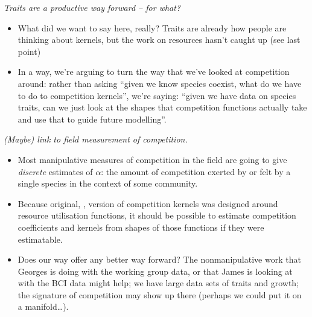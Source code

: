 \documentclass[a4paper,11pt]{article}
\begin{document}
\begin{itemize}
\textit{Traits are a productive way forward -- for what?}
\begin{itemize}
\item What did we want to say here, really?  Traits are already how
  people are thinking about kernels, but the work on resources hasn't
  caught up (see last point)
\item In a way, we're arguing to turn the way that we've looked at
  competition around: rather than asking ``given we know species
  coexist, what do we have to do to competition kernels'', we're
  saying: ``given we have data on species traits, can we just look at
  the shapes that competition functions actually take and use that to
  guide future modelling''.
\end{itemize}

\textit{(Maybe) link to field measurement of competition.}
\begin{itemize}
\item Most manipulative measures of competition in the field are going
  to give \emph{discrete} estimates of $\alpha$: the amount of
  competition exerted by or felt by a single species in the context of
  some community.
\item Because original, \citet{MacArthur-1967}, version of competition
  kernels was designed around resource utilisation functions, it
  should be possible to estimate competition coefficients and kernels
  from shapes of those functions if they were estimatable.
\item Does our way offer any better way forward?  The nonmanipulative
  work that Georges is doing with the working group data, or that
  James is looking at with the BCI data might help; we have large data
  sets of traits and growth; the signature of competition may show up
  there (perhaps we could put it on a manifold\ldots).
\end{itemize}


\end{itemize}
\end{document}
